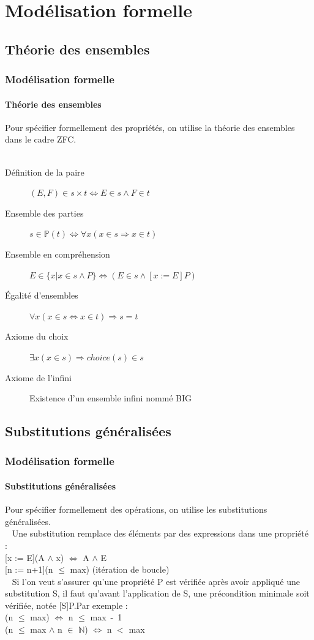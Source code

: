 \documentclass[11pt,a4paper,xcolor=table]{beamer} %
\begin{document}
%
%
\frame{\tableofcontents}

\section{Modélisation formelle}
\subsection{Théorie des ensembles}
\begin{frame}
\frametitle{Modélisation formelle}
\framesubtitle{Théorie des ensembles}
Pour spécifier formellement des propriétés, on utilise la théorie des ensembles dans le cadre ZFC.
\\~\pause
\begin{description}
\item[Définition de la paire] $(E, F) \in s \times t \Leftrightarrow E \in s \wedge F \in t$
\item[Ensemble des parties] $s \in \mathbb{P}(t) \Leftrightarrow \forall x (x \in s \Rightarrow x \in t)$
\item[Ensemble en compréhension] $E \in \{ x | x \in s \wedge P \} \Leftrightarrow (E \in s \wedge [x:= E] P)$
\item[Égalité d'ensembles] $\forall x (x \in s \Leftrightarrow x \in t) \Rightarrow s = t$
\item[Axiome du choix] $\exists x  (x \in s) \Rightarrow choice(s) \in s$
\item[Axiome de l'infini] Existence d'un ensemble infini nommé BIG
\end{description}
\end{frame}

\subsection{Substitutions généralisées}
\begin{frame}
\frametitle{Modélisation formelle}
\framesubtitle{Substitutions généralisées}
Pour spécifier formellement des opérations, on utilise les substitutions généralisées.
\\~\pause
Une substitution remplace des éléments par des expressions dans une propriété :\\[5pt]
[x := E](A $\wedge$ x) $\Leftrightarrow$ A $\wedge$ E\\[5pt]
[n := n+1](n $\leq$ max) (itération de boucle)
\\[10pt]~\pause
Si l'on veut s'assurer qu'une propriété P est vérifiée après avoir appliqué une substitution S, il faut qu'avant l'application de S, une précondition minimale soit vérifiée, notée [S]P.\pause Par exemple :\\[5pt]
\indent[n := n+1](n $\leq$ max) $\Leftrightarrow$ n $\leq$ max\ -\ 1\pause\\
\indent[n := n+1](n $\leq$ max $\wedge$ n $\in$ $\mathbb{N}$) $\Leftrightarrow$ n $<$ max
\end{frame}
\end{document}
